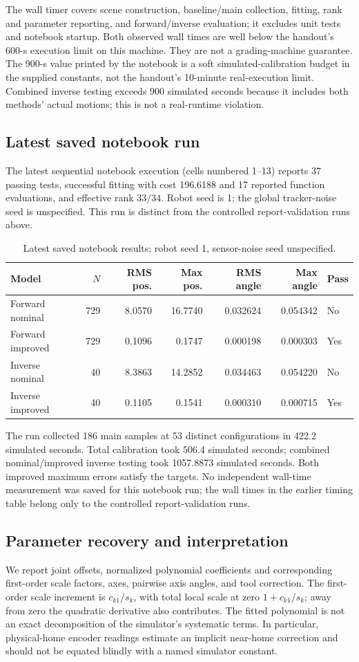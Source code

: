 \documentclass[11pt]{article}
\begin{document}
The wall timer covers scene construction, baseline/main collection, fitting, rank and parameter reporting, and forward/inverse evaluation; it excludes unit tests and notebook startup. Both observed wall times are well below the handout's 600-s execution limit on this machine. They are not a grading-machine guarantee. The 900-s value printed by the notebook is a soft simulated-calibration budget in the supplied constants, not the handout's 10-minute real-execution limit. Combined inverse testing exceeds 900 simulated seconds because it includes both methods' actual motions; this is not a real-runtime violation.


\subsection{Latest saved notebook run}
The latest sequential notebook execution (cells numbered 1--13) reports 37 passing tests, successful fitting with cost 196.6188 and 17 reported function evaluations, and effective rank $33/34$. Robot seed is 1; the global tracker-noise seed is unspecified. This run is distinct from the controlled report-validation runs above.
\begin{table}[H]\centering\small
\caption{Latest saved notebook results; robot seed 1, sensor-noise seed unspecified.}
\begin{tabular}{@{}lrrrrrl@{}}\toprule
Model & $N$ & RMS pos. & Max pos. & RMS angle & Max angle & Pass\\\midrule
Forward nominal & 729 & 8.0570 & 16.7740 & 0.032624 & 0.054342 & No\\
Forward improved & 729 & 0.1096 & 0.1747 & 0.000198 & 0.000303 & Yes\\
Inverse nominal & 40 & 8.3863 & 14.2852 & 0.034463 & 0.054220 & No\\
Inverse improved & 40 & 0.1105 & 0.1541 & 0.000310 & 0.000715 & Yes\\
\bottomrule\end{tabular}\end{table}
The run collected 186 main samples at 53 distinct configurations in 422.2 simulated seconds. Total calibration took 506.4 simulated seconds; combined nominal/improved inverse testing took 1057.8873 simulated seconds. Both improved maximum errors satisfy the targets. No independent wall-time measurement was saved for this notebook run; the wall times in the earlier timing table belong only to the controlled report-validation runs.

\subsection{Parameter recovery and interpretation}
We report joint offsets, normalized polynomial coefficients and corresponding first-order scale factors, axes, pairwise axis angles, and tool correction. The first-order scale increment is $c_{k1}/s_k$, with total local scale at zero $1+c_{k1}/s_k$; away from zero the quadratic derivative also contributes. The fitted polynomial is not an exact decomposition of the simulator's systematic terms. In particular, physical-home encoder readings estimate an implicit near-home correction and should not be equated blindly with a named simulator constant.
\end{document}
